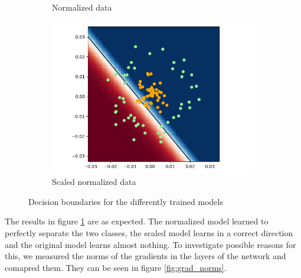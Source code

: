 \documentclass[a4paper,11pt]{article}
\begin{document}
\begin{figure}[ht]
\begin{subfigure}[b]{0.3\textwidth}
        \caption{Normalized data}
    \end{subfigure}
    \hfill
    \begin{subfigure}[b]{0.3\textwidth}
        \includegraphics[width=\textwidth]{../out/02_shallow/mult.png}
        \caption{Scaled normalized data}
    \end{subfigure}
    \hfill
    \caption{Decision boundaries for the differently trained models}
    \label{fig:boundaries}
\end{figure}

The results in figure \ref{fig:boundaries} are as expected.
The normalized model learned to perfectly separate the two classes, the scaled model learns in a correct direction and the original model learns almost nothing.
To investigate possible reasons for this, we measured the norms of the gradients in the layers of the network and comapred them.
They can be seen in figure \ref{fig:grad_norms}.
\end{document}
